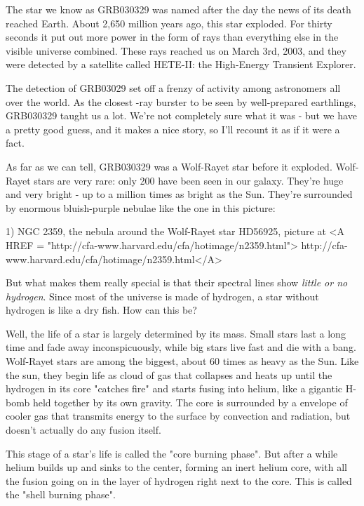 


The star we know as GRB030329 was named after the day the news of its 
death reached Earth.  About 2,650 million years ago, this star exploded. 
For thirty seconds it put out more power in the form of \gamma  rays 
than everything else in the visible universe combined.  These \gamma  
rays reached us on March 3rd, 2003, and they were detected by a 
satellite called HETE-II: the High-Energy Transient Explorer.  

The detection of GRB03029 set off a frenzy of activity among astronomers
all over the world.  As the closest \gamma -ray burster to be seen 
by well-prepared earthlings, GRB030329 taught us a lot.  We're not 
completely sure what it was - but we have a pretty good guess, and it 
makes a nice story, so I'll recount it as if it were a fact.  

As far as we can tell, GRB030329 was a Wolf-Rayet star before it
exploded.    Wolf-Rayet stars are very rare: only 200 have been seen
in our galaxy.  They're huge and very bright - up to a million times
as bright as the Sun.   They're surrounded by enormous bluish-purple 
nebulae like the one in this picture:

1) NGC 2359, the nebula around the Wolf-Rayet star HD56925,
picture at <A HREF = "http://cfa-www.harvard.edu/cfa/hotimage/n2359.html">
http://cfa-www.harvard.edu/cfa/hotimage/n2359.html</A>

But what makes them really special is that their spectral lines show 
\emph{little or no hydrogen}.  
Since most of the universe is made of hydrogen, 
a star without hydrogen is like a dry fish.  How can this be? 

Well, the life of a star is largely determined by its mass.  Small 
stars last a long time and fade away inconspicuously, while big stars 
live fast and die with a bang.  Wolf-Rayet stars are among the biggest, 
about 60 times as heavy as the Sun.   Like the sun, they begin life as 
cloud of gas that collapses and heats up until the hydrogen in its 
core "catches fire" and starts fusing into helium, like a gigantic 
H-bomb held together by its own gravity.  The core is surrounded by a 
envelope of cooler gas that transmits energy to the surface by 
convection and radiation, but doesn't actually do any fusion itself.

This stage of a star's life is called the "core burning phase".  But 
after a while helium builds up and sinks to the center, forming 
an inert helium core, with all the fusion going on in the layer of 
hydrogen right next to the core.   This is called the "shell burning 
phase".  

